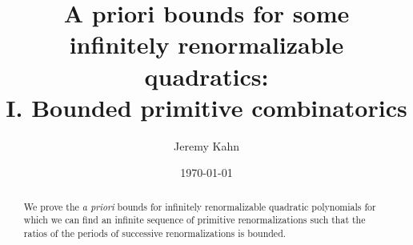 \documentclass[12pt]{amsart}
\author {Jeremy Kahn}
\title[bounds for bounded-primitive type]{A priori bounds for some\\
   infinitely renormalizable quadratics:\\
   {\small I. Bounded primitive combinatorics}}
\date{\today}
\begin{document}
\maketitle

\begin{abstract}
	We prove the \emph{a priori} bounds for infinitely renormalizable quadratic polynomials for which we can find an infinite sequence of primitive renormalizations such that the ratios of the periods of successive renormalizations is bounded.
\end{abstract}


\tableofcontents
















\end{document}
